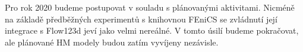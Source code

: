 \documentclass[11pt,a4paper]{article}
\begin{document}
\begin{onehalfspacing}
Pro rok 2020 budeme postupovat v souladu s plánovanými aktivitami. Nicméně na základě předběžných experimentů s knihovnou FEniCS se zvládnutí její integrace s Flow123d jeví jako velmi nereálné. V tomto úsilí budeme pokračovat, ale plánované HM modely budou zatím vyvíjeny nezávisle.


%







\end{onehalfspacing}
\end{document}
